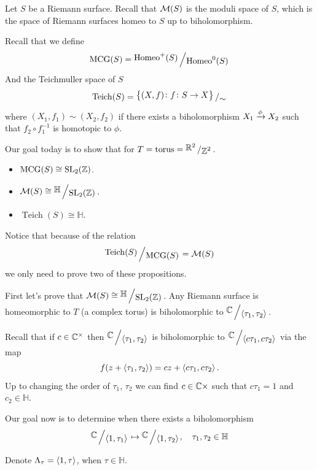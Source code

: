 \documentclass[11pt,a4paper]{article}
\renewcommand{\H}{\mathbb H}
\DeclareMathOperator{\Homeo}{Homeo}
\DeclareMathOperator{\MCG}{MCG}
\DeclareMathOperator{\Teich}{Teich}
\begin{document}

\begin{remark}
  Let $S$ be a Riemann surface.
  Recall that $\mathcal{M}(S)$ is the moduli space of $S$, which is the space of Riemann
  surfaces homeo to $S$ up to biholomorphism.
\end{remark}
Recall that we define
\[
  \MCG(S) = \bigslant{\Homeo^+(S)}{\Homeo^0(S)}
\]
And the Teichmuller space of $S$
\[
  \mathrm{Teich}(S) = 
  \bigslant{\set{(X,f) \colon f \colon S \to X}}{\sim}
\]
where $(X_1,f_1) \sim (X_2,f_2)$ if there exists a biholomorphism 
$X_1 \xrightarrow{\phi} X_2$ such that $f_2 \circ f_1^{-1}$ is homotopic to $\phi$.

Our goal today is to show that for $T = \text{torus} = \bigslant{\R^2}{\Z^2}$.
\begin{itemize}
  \item $\MCG(S) \cong \SL_2(\Z)$.
  \item $\M(S) \cong \bigslant{\H}{\SL_2(\Z)}$.
  \item $\Teich(S) \cong \H$.
\end{itemize}

Notice that because of the relation
\[
  \bigslant{\Teich(S)}{\MCG(S)} = \M(S)
\]
we only need to prove two of these propositions.

First let's prove that $\M(S) \cong \bigslant{\H}{\SL_2(\Z)}$.
Any Riemann surface is homeomorphic to $T$ (a complex torus) is biholomorphic
to $\bigslant{\C}{\ip{\tau_1}{\tau_2}}$.

Recall that if $c \in \mathbb{C}^{\times}$ then $\bigslant{\C}{\ip{\tau_1}{\tau_2}}$
is biholomorphic to $\bigslant{\C}{\ip{c \tau_1}{c \tau_2}}$ via the map
\[
  f(z + \left\langle \tau_1, \tau_2 \right\rangle) = cz + \left\langle c \tau_1, c \tau_2 \right\rangle.
\]
Up to changing the order of $\tau_1$, $\tau_2$ we can find $c \in \mathbb{C}{\times}$
such that $c \tau_1 = 1$ and $c_2 \in \H$.

Our goal now is to determine when there exists a biholomorphism
\[
  \bigslant{\C}{\ip{1}{\tau_1}} \mapsto
  \bigslant{\C}{\ip{1}{\tau_2}}, \quad \tau_1,\tau_2 \in \H
\]

Denote $\Lambda_{\tau} = \left\langle 1, \tau \right\rangle$, when $\tau \in \H$.
\end{document}
